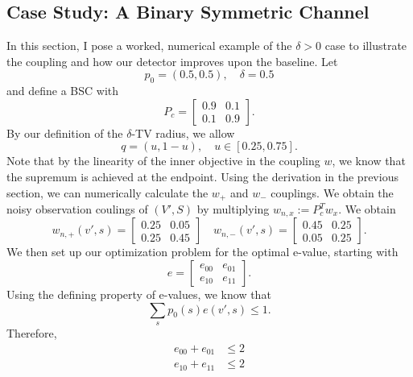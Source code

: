 \documentclass[12pt]{article}
\theoremstyle{plain}
\theoremstyle{definition}
\begin{document}
\subsection{Case Study: A Binary Symmetric Channel}
In this section, I pose a worked, numerical example of the $\delta>0$ case to illustrate the coupling and how our detector improves upon the baseline. Let
\begin{equation}
    p_0=(0.5,0.5),\quad \delta=0.5
\end{equation}
and define a BSC with
\begin{equation}
    P_c=\begin{bmatrix}
        0.9 & 0.1 \\
        0.1 & 0.9
    \end{bmatrix}.
\end{equation}
By our definition of the $\delta$-TV radius, we allow
\begin{equation}
    q=(u,1-u),\quad u\in [0.25, 0.75].
\end{equation}
Note that by the linearity of the inner objective in the coupling $w$, we know that the supremum is achieved at the endpoint. Using the derivation in the previous section, we can numerically calculate the $w_+$ and $w_-$ couplings. We obtain the noisy observation coulings of $(V',S)$ by multiplying $w_{n,x}:=P_c^T w_x$. We obtain
\begin{equation}
    w_{n,+}(v',s)=\begin{bmatrix}
        0.25 & 0.05 \\
        0.25 & 0.45
    \end{bmatrix} \quad
    w_{n,-}(v',s)=\begin{bmatrix}
        0.45 & 0.25 \\
        0.05 & 0.25
    \end{bmatrix}.
\end{equation}
We then set up our optimization problem for the optimal e-value, starting with
\begin{equation}
    e=\begin{bmatrix}
        e_{00} & e_{01} \\
        e_{10} & e_{11}
    \end{bmatrix}.
\end{equation}
Using the defining property of e-values, we know that
\begin{equation}
    \sum_s p_0(s)e(v',s)\leq 1.
\end{equation}
Therefore,
\begin{align}
    e_{00}+e_{01}&\leq 2\\
    e_{10}+e_{11}&\leq 2
\end{align}
\end{document}
